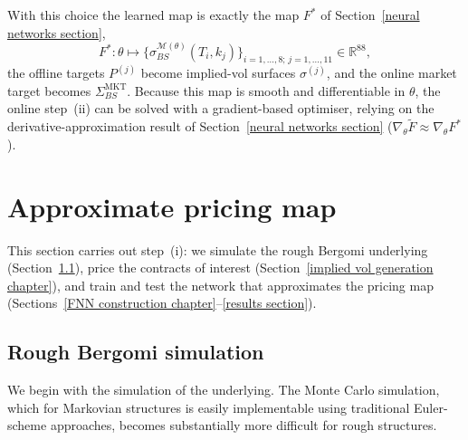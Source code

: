 \documentclass[12pt,a4paper]{article}
\theoremstyle{remark} \newtheorem{remark}[theorem]{Remark}
\begin{document}
With this choice the learned map is exactly the map $F^*$ of Section~\ref{neural networks section},
\[
F^*:\theta\mapsto\big\{\sigma_{BS}^{\mathcal M(\theta)}(T_i,k_j)\big\}_{i=1,\dots,8;\,j=1,\dots,11}\in\mathbb R^{88},
\]
the offline targets $P^{(j)}$ become implied-vol surfaces $\sigma^{(j)}$, and the online market target becomes $\Sigma^{\mathrm{MKT}}_{BS}$. Because this map is smooth and differentiable in $\theta$, the online step~(ii) can be solved with a gradient-based optimiser, relying on the derivative-approximation result of Section~\ref{neural networks section} ($\nabla_\theta\widetilde F\approx\nabla_\theta F^*$).





\section{Approximate pricing map}\label{approximate pricing map}
This section carries out step~(i): we simulate the rough Bergomi underlying (Section~\ref{rough bergomi chapter}), price the contracts of interest (Section~\ref{implied vol generation chapter}), and train and test the network that approximates the pricing map (Sections~\ref{FNN construction chapter}--\ref{results section}).
\subsection{Rough Bergomi simulation}\label{rough bergomi chapter}
We begin with the simulation of the underlying. The Monte Carlo simulation, which for Markovian structures is easily implementable using traditional Euler-scheme approaches, becomes substantially more difficult for rough structures.
\end{document}
